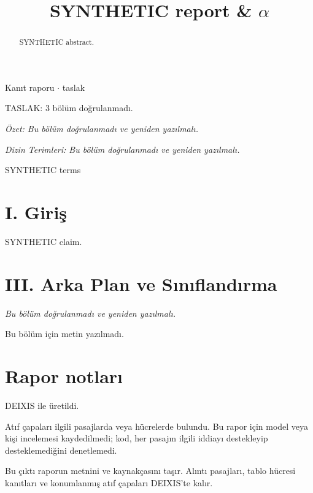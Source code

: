 \documentclass[journal]{IEEEtran}
\begin{document}
\renewcommand{\abstractname}{Özet}
\renewcommand{\IEEEkeywordsname}{Dizin Terimleri}
\renewcommand{\refname}{Kaynaklar}

\title{SYNTHETIC report \& \ensuremath{\alpha}}

\maketitle

\noindent Kanıt raporu \ensuremath{\cdot} taslak

\noindent TASLAK: 3 bölüm doğrulanmadı.

\noindent\textit{Özet: Bu bölüm doğrulanmadı ve yeniden yazılmalı.}

\begin{abstract}

SYNTHETIC abstract.

\end{abstract}

\noindent\textit{Dizin Terimleri: Bu bölüm doğrulanmadı ve yeniden yazılmalı.}

\begin{IEEEkeywords}

SYNTHETIC terms

\end{IEEEkeywords}

\section*{I. Giriş}

SYNTHETIC claim. \cite{Synth26}

\section*{III. Arka Plan ve Sınıflandırma}

\noindent\textit{Bu bölüm doğrulanmadı ve yeniden yazılmalı.}

Bu bölüm için metin yazılmadı.

\section*{Rapor notları}

DEIXIS ile üretildi.

Atıf çapaları ilgili pasajlarda veya hücrelerde bulundu. Bu rapor için model veya kişi incelemesi kaydedilmedi; kod, her pasajın ilgili iddiayı destekleyip desteklemediğini denetlemedi.

Bu çıktı raporun metnini ve kaynakçasını taşır. Alıntı pasajları, tablo hücresi kanıtları ve konumlanmış atıf çapaları DEIXIS'te kalır.




\end{document}
